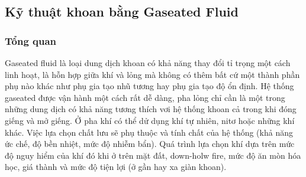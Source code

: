 \documentclass[12pt,a4paper]{article}
\begin{document}
\subsection{Kỹ thuật khoan bằng Gaseated Fluid}
\subsubsection{Tổng quan}
	Gaseated fluid\cite{rehm2013underbalanced} là loại dung dịch khoan có khả năng thay đổi tỉ trọng một cách linh hoạt, là hỗn hợp giữa khí và lỏng mà không có thêm bất cứ một thành phần phụ nào khác như phụ gia tạo nhũ tương hay phụ gia tạo độ ổn định. Hệ thống gaseated được vận hành một cách rất dễ dàng, pha lỏng chỉ cần là một trong những dung dịch có khả năng tương thích vơi hệ thống khoan cả trong khi đóng giếng và mở giếng. Ở pha khí có thể dử dụng khí tự nhiên, nitơ hoặc những khí khác. Việc lựa chọn chất lưu sẽ phụ thuộc và tính chất của hệ thống (khả năng ức chế, độ bền nhiệt, mức độ nhiễm bẩn). Quá trình lựa chọn khí dựa trên mức độ nguy hiểm của khí đó khi ở trên mặt đất, down-holw fire, mức độ ăn mòn hóa học, giá thành và mức độ tiện lợi (ở gần hay xa giàn khoan).
\end{document}
